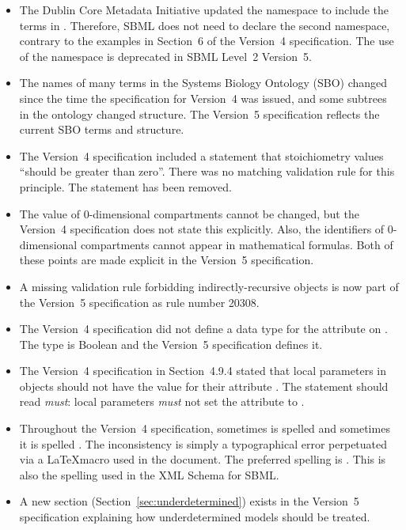 \begin{itemize}
\item The Dublin Core Metadata Initiative updated the namespace
   to include the terms in
  . Therefore, SBML does not
  need to declare the second namespace, contrary to the examples
  in Section~6 of the Version~4 specification.  The use of the
   namespace is deprecated
  in SBML Level~2 Version~5.

\item The names of many terms in the Systems Biology Ontology
  (SBO) changed since the time the specification for Version~4 was
  issued, and some subtrees in the ontology changed structure.
  The Version~5 specification reflects the current SBO terms and
  structure.

\item The Version~4 specification included a statement that
  stoichiometry values ``should be greater than zero''.  There was
  no matching validation rule for this principle.  The statement
  has been removed.

\item The value of 0-dimensional compartments cannot be changed,
  but the Version~4 specification does not state this explicitly.
  Also, the identifiers of 0-dimensional compartments cannot
  appear in mathematical formulas.  Both of these points are made
  explicit in the Version~5 specification.

\item A missing validation rule forbidding indirectly-recursive
  \FunctionDefinition objects is now part of the Version~5
  specification as rule number 20308.

\item The Version~4 specification did not define a data type for
  the  attribute on \Event.  The
  type is Boolean and the Version~5 specification defines it.

\item The Version~4 specification in Section~4.9.4 stated that
  local parameters in \Reaction objects should not have the value
   for their attribute .  The statement
  should read \emph{must}: local parameters \emph{must} not set
  the  attribute to .

\item Throughout the Version~4 specification, sometimes \SBase is
  spelled  and sometimes it is spelled
  . The inconsistency is simply a typographical
  error perpetuated via a \LaTeX macro used in the document. The
  preferred spelling is \SBase. This is also the spelling used in
  the XML Schema for SBML.

\item A new section (Section~\ref{sec:underdetermined}) exists in
  the Version~5 specification explaining how underdetermined
  models should be treated.

\end{itemize}


\renewcommand{\thesubsection}{\Alph{section}.\arabic{subsection}}

